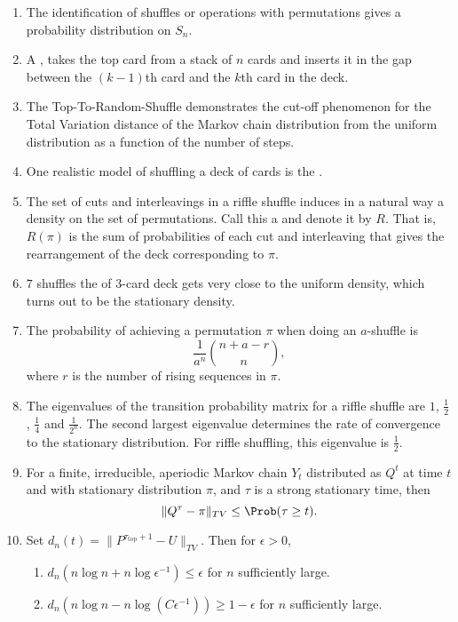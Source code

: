 \documentclass[12pt]{article}
\begin{document}
\begin{enumerate}
    \item
        The identification of shuffles or operations with permutations
        gives a probability distribution on \( S_n \).
    \item
        A ,%
        takes the top card from a stack of \( n \) cards and inserts it
        in the gap between the \( (k-1) \)th card and the \( k \)th card
        in the deck.
    \item
        The Top-To-Random-Shuffle demonstrates the cut-off phenomenon
        for the Total Variation distance of the Markov chain
        distribution from the uniform distribution as a function of the
        number of steps.
    \item
        One realistic model of shuffling a deck of cards is the .
    \item
        The set of cuts and interleavings in a riffle shuffle induces in
        a natural way a density on the set of permutations.  Call this a
         and denote it by \( R \).  That is, \( R(\pi)
        \) is the sum of probabilities of each cut and interleaving that
        gives the rearrangement of the deck corresponding to \( \pi \).
    \item
        \( 7 \) shuffles the of 3-card deck gets very close to the
        uniform density, which turns out to be the stationary density.
    \item
        The probability of achieving a permutation \( \pi \) when doing
        an \( a \)-shuffle is
        \[
            \frac{1}{a^n} \binom{n + a - r}{n},
        \] where \( r \) is the number of rising sequences in \( \pi \).
    \item
        The eigenvalues of the transition probability matrix for a
        riffle shuffle are \( 1 \), \( \frac{1}{2} \), \( \frac{1}{4} \)
        and \( \frac{1}{2^n} \).  The second largest eigenvalue
        determines the rate of convergence to the stationary
        distribution.  For riffle shuffling, this eigenvalue is \( \frac
        {1}{2} \).
    \item
        For a finite, irreducible, aperiodic Markov chain \( Y_t \)
        distributed as \( Q^t \) at time \( t \) and with stationary
        distribution \( \pi \), and \( \tau \) is a strong stationary
        time, then
        \[
            \| Q^{\tau} - \pi \|_{TV} \le \Prob(\tau \ge t).
        \]
    \item
        Set \( d_n(t) = \| P^{\tau_{\text{top}}+1} - U \|_{TV} \).  Then
        for \( \epsilon > 0 \),
        \begin{enumerate}
            \item
                \( d_{n}(n \log n + n \log \epsilon^{-1} )\le \epsilon \)
                for \( n \) sufficiently large.
            \item
                \( d_{n}(n \log n - n \log (C \epsilon^{-1})) \ge 1-\epsilon
                \) for \( n \) sufficiently large.
        \end{enumerate}
\end{enumerate}
\end{document}
